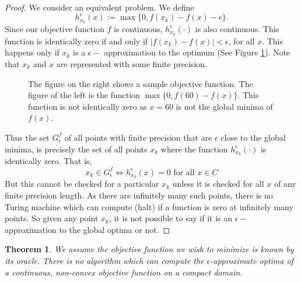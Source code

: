 \documentclass[a4paper,11pt]{article}
\newtheorem{theorem}{Theorem}[section]
\theoremstyle{definition}
\theoremstyle{remark}
\begin{document}
	\begin{proof}				
		We consider an equivalent problem. We define
		\begin{equation*}
			h_{x_k}^{\epsilon}(x) := \max \{0,f(x_k)-f(x)-\epsilon\}.
		\end{equation*}
		Since our objective function $f$ is continuous, $h_{x_k}^{\epsilon}(\cdot)$ is also continuous. 
		This function is identically zero if and only if $|f(x_k) - f(x)| < \epsilon$, for all $x$. This happens only if $x_k$ is a $\epsilon-$ approximation to the optimum (See Figure \ref{illusfig}). Note that $x_k$ and $x$ are represented with some finite precision. %
		\begin{figure}[!ht]
			\centering
			\caption{The figure on the right shows a sample objective function. The figure of the left is the function $ \max \{0,f(60)-f(x) \}$. This function  is not identically zero as $x=60$ is not the global minima of $f(x)$.}
			\label{illusfig}
		\end{figure}
		
		
		Thus the set $G^f_{\epsilon}$ of all points with finite precision that are $\epsilon$ close to the global minima, is precisely the set of all points $x_k$ where the function $h_{x_k}^{\epsilon}(\cdot)$ is identically zero.
		That is, 
		\[ x_k \in G^f_{\epsilon} \Leftrightarrow h_{x_k}^{\epsilon}(x) = 0 \mbox{ for all } x \in C \]
		But this cannot be checked for a particular $x_k$ unless it is checked for all $x$ of any finite precision length. As there are infinitely many such points, there is no Turing machine which can compute (halt) if a function is zero at infinitely many points.
		So given any point $x_k$, it is not possible to say if it is an $\epsilon-$ approximation to the global optima or not.
		\end{proof}
		
		\begin{theorem}\label{mainthm}
			We assume the objective function we wish to minimize is known by its oracle. There is no algorithm which can compute the $\epsilon$-approximate optima of a continuous, non-convex objective function on a compact domain.
		\end{theorem}
		
\end{document}
